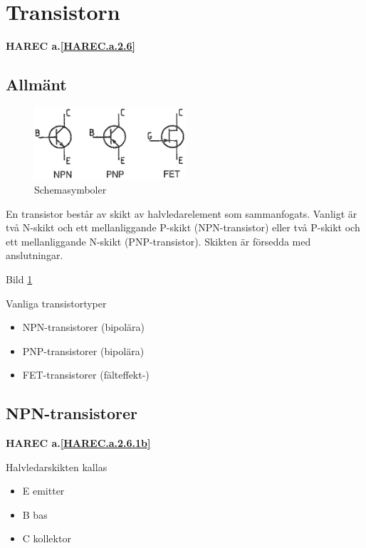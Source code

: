 \section{Transistorn}
\textbf{HAREC a.\ref{HAREC.a.2.6}\label{myHAREC.a.2.6}}
\label{transistorn}

\subsection{Allmänt}

\begin{figure}
\includegraphics[width=0.5\textwidth]{images/cropped_pdfs/bild_2_2-16.pdf}
\caption{Schemasymboler}
\label{fig:BildII2-16}
\end{figure}

En transistor består av skikt av halvledarelement som sammanfogats. Vanligt är
två N-skikt och ett mellanliggande P-skikt (NPN-transistor) eller två P-skikt och
ett mellanliggande N-skikt (PNP-transistor). Skikten är försedda med
anslutningar.

Bild \ref{fig:BildII2-16}

Vanliga transistortyper
\begin{itemize}
\item NPN-transistorer (bipolära)
\item PNP-transistorer (bipolära)
\item FET-transistorer (fälteffekt-)
\end{itemize}

\subsection{NPN-transistorer}
\textbf{HAREC a.\ref{HAREC.a.2.6.1b}\label{myHAREC.a.2.6.1b}}

Halvledarskikten kallas
\begin{itemize}
\item E emitter
\item B bas
\item C kollektor
\end{itemize}

